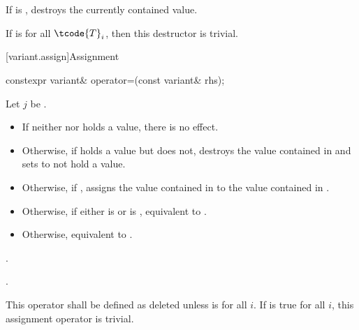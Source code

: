 \begin{itemdescr}
\pnum
\effects
If  is ,
destroys the currently contained value.

\pnum
\remarks
If  is  for all $\tcode{T}_i$,
then this destructor is trivial.
\end{itemdescr}

[variant.assign]{Assignment}

%
\begin{itemdecl}
constexpr variant& operator=(const variant& rhs);
\end{itemdecl}

\begin{itemdescr}
\pnum
Let $j$ be .

\pnum
\effects
\begin{itemize}
\item
If neither  nor  holds a value, there is no effect.
\item
Otherwise, if  holds a value but  does not, destroys the value
contained in  and sets  to not hold a value.
\item
Otherwise, if , assigns the value contained in 
to the value contained in .
\item
Otherwise, if either 
is  or
 is ,
equivalent to .
\item
Otherwise, equivalent to .
\end{itemize}

\pnum
\returns
{}.

\pnum
\ensures
{}.

\pnum
\remarks
This operator shall be defined as deleted unless
is  for all $i$.
If 
is true for all $i$, this assignment operator is trivial.
\end{itemdescr}

